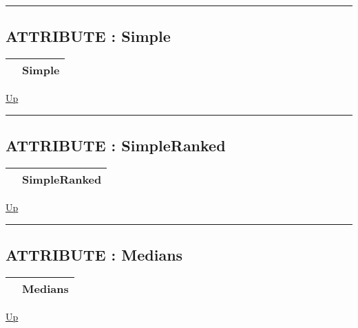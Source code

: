 \rule{\textwidth}{0.4pt}

\subsection*{ATTRIBUTE : Simple}
\hypertarget{ecldoc:ml_core.fieldaggregates.simple}{}

{\renewcommand{\arraystretch}{1.5}
\begin{tabularx}{\textwidth}{|>{\raggedright\arraybackslash}l|X|}
\hline
\hspace{0pt} & Simple \\
\hline
\end{tabularx}
}

\hyperlink{ecldoc:ml_core.fieldaggregates}{Up}

\par


\rule{\textwidth}{0.4pt}
\subsection*{ATTRIBUTE : SimpleRanked}
\hypertarget{ecldoc:ml_core.fieldaggregates.simpleranked}{}

{\renewcommand{\arraystretch}{1.5}
\begin{tabularx}{\textwidth}{|>{\raggedright\arraybackslash}l|X|}
\hline
\hspace{0pt} & SimpleRanked \\
\hline
\end{tabularx}
}

\hyperlink{ecldoc:ml_core.fieldaggregates}{Up}

\par


\rule{\textwidth}{0.4pt}
\subsection*{ATTRIBUTE : Medians}
\hypertarget{ecldoc:ml_core.fieldaggregates.medians}{}

{\renewcommand{\arraystretch}{1.5}
\begin{tabularx}{\textwidth}{|>{\raggedright\arraybackslash}l|X|}
\hline
\hspace{0pt} & Medians \\
\hline
\end{tabularx}
}

\hyperlink{ecldoc:ml_core.fieldaggregates}{Up}

\par


